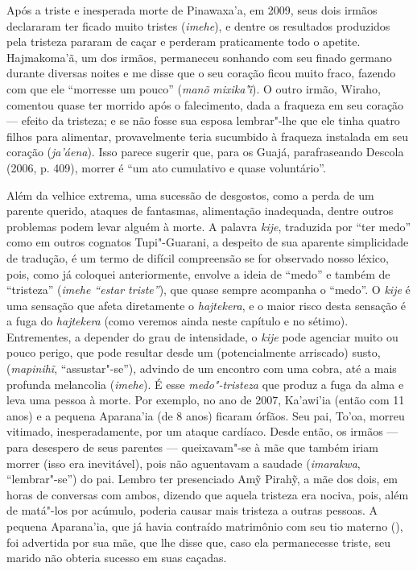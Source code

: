Após a triste e inesperada morte de Pinawaxa'a, em 2009, seus dois
irmãos declararam ter ficado muito tristes (\emph{imehe}), e dentre os
resultados produzidos pela tristeza pararam de caçar e perderam
praticamente todo o apetite. Hajmakoma'ã, um dos irmãos, permaneceu
sonhando com seu finado germano durante diversas noites e me disse que o
seu coração ficou muito fraco, fazendo com que ele ``morresse um pouco''
(\emph{manõ} \emph{mixika'i}̃). O outro irmão, Wiraho, comentou quase ter
morrido após o falecimento, dada a fraqueza em seu coração --- efeito da
tristeza; e se não fosse sua esposa lembrar"-lhe que ele tinha quatro
filhos para alimentar, provavelmente teria sucumbido à fraqueza
instalada em seu coração (\emph{ja'áena}). Isso parece sugerir que, para
os Guajá, parafraseando Descola (2006, p. 409), morrer é ``um ato
cumulativo e quase voluntário''.

Além da velhice extrema, uma sucessão de desgostos, como a perda de um
parente querido, ataques de fantasmas, alimentação inadequada, dentre
outros problemas podem levar alguém à morte. A palavra \emph{kije},
traduzida por ``ter medo'' como em outros cognatos Tupi"-Guarani, a
despeito de sua aparente simplicidade de tradução, é um termo de difícil
compreensão se for observado nosso léxico, pois, como já coloquei
anteriormente, envolve a ideia de ``medo'' e também de ``tristeza''
(\emph{imehe ``estar triste''}), que quase sempre acompanha o ``medo''. O
\emph{kije} é uma sensação que afeta diretamente o \emph{hajtekera}, e o
maior risco desta sensação é a fuga do \emph{hajtekera} (como veremos
ainda neste capítulo e no sétimo). Entrementes, a depender do grau de
intensidade, o \emph{kije} pode agenciar muito ou pouco perigo, que pode
resultar desde um (potencialmente arriscado) susto, (\emph{mapinihĩ},
``assustar"-se''), advindo de um encontro com uma cobra, até a mais
profunda melancolia (\emph{imehe}). É esse \emph{medo"-tristeza} que
produz a fuga da alma e leva uma pessoa à morte. Por exemplo, no ano de
2007, Ka'awi'ia (então com 11 anos) e a pequena Aparana'ia (de 8 anos)
ficaram órfãos. Seu pai, To'oa, morreu vitimado, inesperadamente, por um
ataque cardíaco. Desde então, os irmãos --- para desespero de seus
parentes --- queixavam"-se à mãe que também iriam morrer (isso era
inevitável), pois não aguentavam a saudade (\emph{imarakwa},
``lembrar"-se'') do pai. Lembro ter presenciado Amỹ Pirahỹ, a mãe dos dois,
em horas de conversas com ambos, dizendo que aquela tristeza era nociva,
pois, além de matá"-los por acúmulo, poderia causar mais tristeza a
outras pessoas. A pequena Aparana'ia, que já havia contraído matrimônio
com seu tio materno (), foi advertida por sua mãe, que lhe disse que,
caso ela permanecesse triste, seu marido não obteria sucesso em suas
caçadas.

